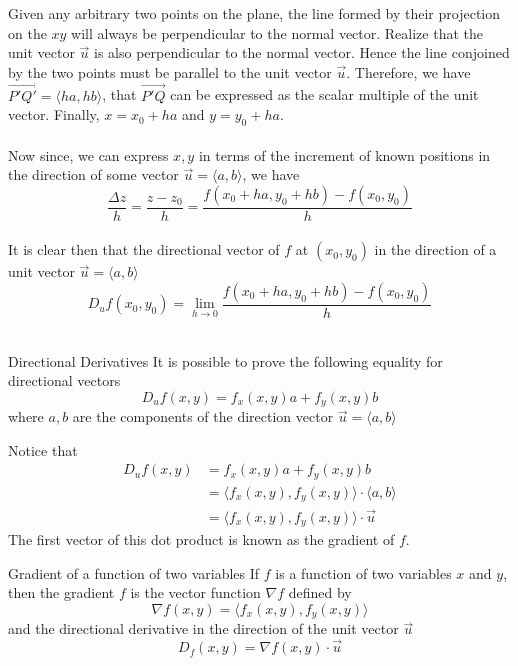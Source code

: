 \documentclass{article}
\begin{document}
	Given any arbitrary two points on the plane, the line formed by their projection
	on the $xy$ will always be perpendicular to the normal vector. Realize that
	the unit vector $\vec{u}$ is also perpendicular to the normal vector. Hence the
	line conjoined by the two points must be parallel to the unit vector $\vec{u}$.
	Therefore, we have $\overrightarrow{P'Q'}= \langle ha, hb \rangle$, that
	$\overrightarrow{P'Q}$ can be expressed as the scalar multiple of the unit
	vector. Finally, $x=x_{0}+ha$ and $y=y_{0} +ha$. \\ \\ Now since, we can
	express $x,y$ in terms of the increment of known positions in the direction of
	some vector $\vec{u}= \langle a,b \rangle$, we have \\
	\[
		\frac{\Delta z}{h}= \frac{z-z_{0}}{h}= \frac{f(x_{0}+ha,y_{0} + hb) - f(x_{0},y_{0})}{h}
	\]
	\\ It is clear then that the directional vector of $f$ at $(x_{0},y_{0})$ in the
	direction of a unit vector $\vec{u}= \langle a,b \rangle$ \\
	\[
		D_{u}f(x_{0},y_{0}) = \lim_{h \to 0}\frac{f(x_{0}+ha,y_{0} + hb) - f(x_{0},y_{0})}{h}
	\]
	\\
	\begin{mybox}
		{Directional Derivatives} It is possible to prove the following equality for
		directional vectors
		\[
			D_{u}f(x,y) = f_{x}(x,y)a + f_{y}(x,y)b
		\]
		where $a,b$ are the components of the direction vector $\vec{u}= \langle a, b
		\rangle$
	\end{mybox}
	Notice that
	\begin{align*}
		D_{u}f(x,y) & = f_{x}(x,y)a + f_{y}(x,y)b                                       \\
		            & = \langle f_{x}(x,y),f_{y}(x,y) \rangle \cdot \langle a,b \rangle \\
		            & = \langle f_{x}(x,y),f_{y}(x,y) \rangle \cdot \vec{u}
	\end{align*}
	The first vector of this dot product is known as the gradient of $f$.
	\begin{mybox}
		{Gradient of a function of two variables} If $f$ is a function of two variables
		$x$ and $y$, then the gradient $f$ is the vector function $\nabla f$ defined
		by
		\[
			\nabla f(x,y) = \langle f_{x}(x,y), f_{y}(x,y) \rangle
		\]
		and the directional derivative in the direction of the unit vector $\vec{u}$
		\[
			D_{f}(x,y) = \nabla f(x,y) \cdot \vec{u}
		\]
	\end{mybox}
\end{document}
